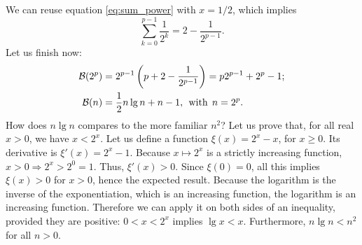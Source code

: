 We can reuse equation \eqref{eq:sum_power} 
with \(x=1/2\), which implies
\begin{equation}
\sum_{k=0}^{p-1}{\frac{1}{2^k}} = 2 - \frac{1}{2^{p-1}}.
\label{eq:sum0.5k}
\end{equation}
Let us finish now:
\begin{align}
\mathcal{B}(2^p)
  &= 2^{p-1} \left(p +  2 - \frac{1}{2^{p-1}}\right)
   = p2^{p-1} + 2^p - 1;\label{eq:best_power}\\
\mathcal{B}(n)
  &= \frac{1}{2}n\lg n + n - 1,\,\; \text{with} \,\; n=2^p.\notag
\end{align}
How does \(n \lg n\) compares to the more familiar \(n^2\)? Let us
prove that, for all real \(x > 0\), we have \(x < 2^x\). Let us define
a function \(\xi(x) = 2^x - x\), for \(x \geqslant 0\). Its derivative
is \(\xi'(x) = 2^x - 1\). Because \(x \mapsto 2^x\) is a strictly
increasing function, \(x > 0 \Rightarrow 2^x > 2^0 = 1\). Thus,
\(\xi'(x) > 0\). Since \(\xi(0) = 0\), all this implies \(\xi(x) > 0\)
for \(x > 0\), hence the expected result. Because the logarithm is the
inverse of the exponentiation, which is an increasing function, the
logarithm is an increasing function. Therefore we can apply it on both
sides of an inequality, provided they are positive: \(0 < x < 2^x\)
implies \(\lg x < x\). Furthermore, \(n \lg n < n^2\) for all \(n>0\).

